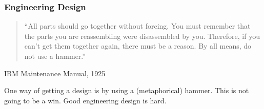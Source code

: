 \begin{frame}
\frametitle{Engineering Design}

\begin{quote}
``All parts should go together without forcing.  You must remember that the parts you are reassembling were disassembled by you.  Therefore, if you can't get them together again, there must be a reason.  By all means, do not use a hammer.''
\end{quote}
\hfill IBM Maintenance Manual, 1925\\[1em]

\begin{changemargin}{1cm}
One way of getting a design is by using a (metaphorical) hammer. This is
not going to be a win. Good engineering design is hard.
\end{changemargin}

\end{frame}

